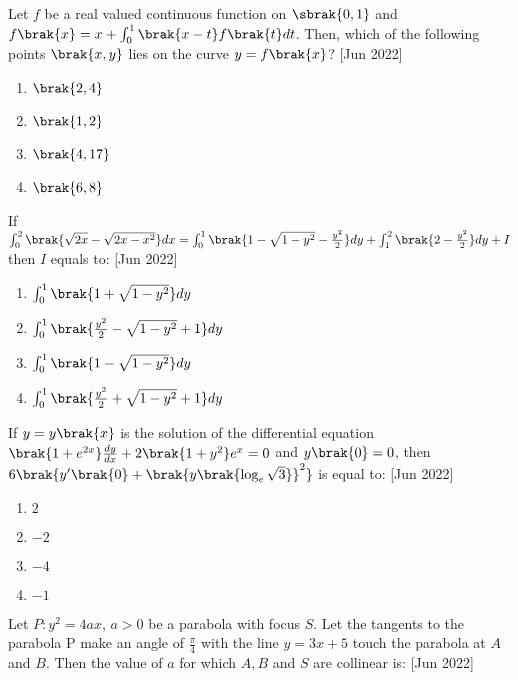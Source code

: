 	\item Let $f$ be a real valued continuous function on $\sbrak{0,1}$ and $f\brak{x}=x+\int_{0}^{1}\brak{x-t}f\brak{t}dt$. Then, which of the following points $\brak{x,y}$ lies on the curve $y=f\brak{x}$? \hfill{[Jun 2022]}
		\begin{enumerate}
			\item $\brak{2,4}$\\
			\item $\brak{1,2}$\\
			\item $\brak{4,17}$\\
			\item $\brak{6,8}$\\
		\end{enumerate}
	\item If $\int_{0}^{2}\brak{\sqrt{2x}-\sqrt{2x-x^2}}dx=\int_{0}^{1}\brak{1-\sqrt{1-y^2}-\frac{y^2}{2}}dy+\int_{1}^{2}\brak{2-\frac{y^2}{2}}dy+I$ then $I$ equals to: \hfill{[Jun 2022]}
		\begin{enumerate}
			\item $\int_{0}^{1}\brak{1+\sqrt{1-y^2}}dy$\\
			\item $\int_{0}^{1}\brak{\frac{y^2}{2}-\sqrt{1-y^2}+1}dy$\\
			\item $\int_{0}^{1}\brak{1-\sqrt{1-y^2}}dy$\\
			\item $\int_{0}^{1}\brak{\frac{y^2}{2}+\sqrt{1-y^2}+1}dy$\\
		\end{enumerate}
	\item If $y=y\brak{x}$ is the solution of the differential equation $\brak{1+e^{2x}}\frac{dy}{dx}+2\brak{1+y^2}e^{x}=0$ and $y\brak{0}=0$, then $6\brak{y'\brak{0}+{\brak{y\brak{\log_{e}\sqrt{3}}}}^2}$ is equal to: \hfill{[Jun 2022]}
		\begin{enumerate}
			\item $2$\\
			\item $-2$\\
			\item $-4$\\
			\item $-1$\\
		\end{enumerate}
	\item Let $P:y^2=4ax$, $a>0$ be a parabola with focus $S$. Let the tangents to the parabola P make an angle of $\frac{\pi}{4}$ with the line $y=3x+5$ touch the parabola at $A$ and $B$. Then the value of $a$ for which $A,B$ and $S$ are collinear is: \hfill{[Jun 2022]}
